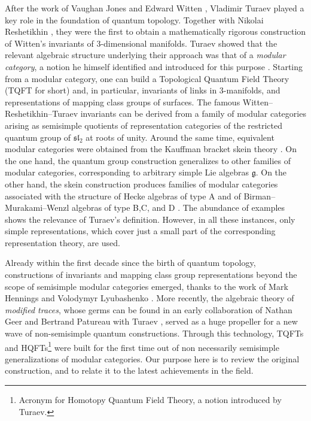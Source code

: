 \documentclass[a4paper,reqno]{amsart}
\theoremstyle{definition}
\theoremstyle{remark}
\newcommand{\frakg}{\mathfrak{g}}
\newcommand{\fsl}{\mathfrak{sl}}
\begin{document}
After the work of Vaughan Jones \cite{J85} and Edward Witten \cite{W88,W89}, Vladimir Turaev played a key role in the foundation of quantum topology. Together with Nikolai Reshetikhin \cite{RT91}, they were the first to obtain a mathematically rigorous construction of Witten's invariants of 3-dimensional manifolds. Turaev showed that the relevant algebraic structure underlying their approach was that of a \textit{modular category}, a notion he himself identified and introduced for this purpose \cite{T94}. Starting from a modular category, one can build a Topological Quantum Field Theory (TQFT for short) and, in particular, invariants of links in 3-manifolds, and representations of mapping class groups of surfaces. The famous Witten--Reshetikhin--Turaev invariants can be derived from a family of modular categories arising as semisimple quotients of representation categories of the restricted quantum group of $\fsl_2$ at roots of unity. Around the same time, equivalent modular categories were obtained from the Kauffman bracket skein theory \cite{BHMV95}. On the one hand, the quantum group construction generalizes to other families of modular categories, corresponding to arbitrary simple Lie algebras $\frakg$. On the other hand, the skein construction produces families of modular categories associated with the structure of Hecke algebras of type A \cite{B98} and of Birman--Murakami--Wenzl algebras of type B,C, and D \cite{BB00}. The abundance of examples shows the relevance of Turaev's definition. However, in all these instances, only simple representations, which cover just a small part of the corresponding representation theory, are used.

Already within the first decade since the birth of quantum topology, constructions of invariants and mapping class group representations beyond the scope of semisimple modular categories emerged, thanks to the work of Mark Hennings \cite{H96} and Volodymyr Lyubashenko \cite{L94}. More recently, the algebraic theory of \textit{modified traces}, whose germs can be found in an early collaboration of Nathan Geer and Bertrand Patureau with Turaev \cite{GPT07}, served as a huge propeller for a new wave of non-semisimple quantum constructions. Through this technology, TQFTs and HQFTs\footnote{Acronym for Homotopy Quantum Field Theory, a notion introduced by Turaev.} were built for the first time out of non necessarily semisimple generalizations of modular categories. Our purpose here is to review the original construction, and to relate it to the latest achievements in the field.
\end{document}
